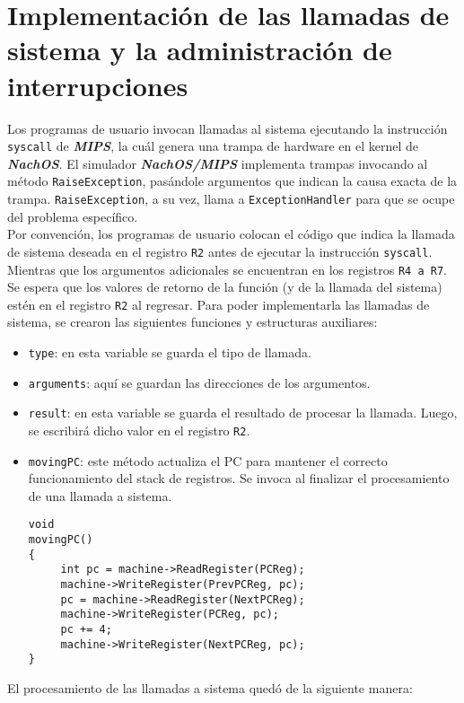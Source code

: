 \section{Implementación de las llamadas de sistema y la administración de interrupciones}
Los programas de usuario invocan llamadas al sistema ejecutando la instrucción \texttt{syscall} de \textbf{\textit{MIPS}}, la cuál genera una trampa de hardware en el kernel de \textbf{\textit{NachOS}}. El simulador \textbf{\textit{NachOS/MIPS}} implementa trampas invocando al método \texttt{RaiseException}, pasándole argumentos que indican la causa exacta de la trampa. \texttt{RaiseException}, a su vez, llama a \texttt{ExceptionHandler} para que se ocupe del problema específico.\\
Por convención, los programas de usuario colocan el código que indica la llamada de sistema deseada en el registro \texttt{R2} antes de ejecutar la instrucción \texttt{syscall}. Mientras que los argumentos adicionales se encuentran en los registros \texttt{R4 a R7}. Se espera que los valores de retorno de la función (y de la llamada del sistema) estén en el registro \texttt{R2} al regresar.\newpage
Para poder implementarla las llamadas de sistema, se crearon las siguientes funciones y estructuras auxiliares:
\begin{itemize}
    \item \texttt{type}: en esta variable se guarda el tipo de llamada.
    \item \texttt{arguments}: aquí se guardan las direcciones de los argumentos.
    \item \texttt{result}: en esta variable se guarda el resultado de procesar la llamada. Luego, se escribirá dicho valor en el registro \texttt{R2}.
    \item \texttt{movingPC}: este método actualiza el PC para mantener el correcto funcionamiento del stack de registros. Se invoca al finalizar el procesamiento de una llamada a sistema.
        \begin{lstlisting}[style=C]
void
movingPC()
{
     int pc = machine->ReadRegister(PCReg);
     machine->WriteRegister(PrevPCReg, pc);
     pc = machine->ReadRegister(NextPCReg);
     machine->WriteRegister(PCReg, pc);
     pc += 4;
     machine->WriteRegister(NextPCReg, pc);
}
        \end{lstlisting}
\end{itemize}
El procesamiento de las llamadas a sistema quedó de la siguiente manera:
